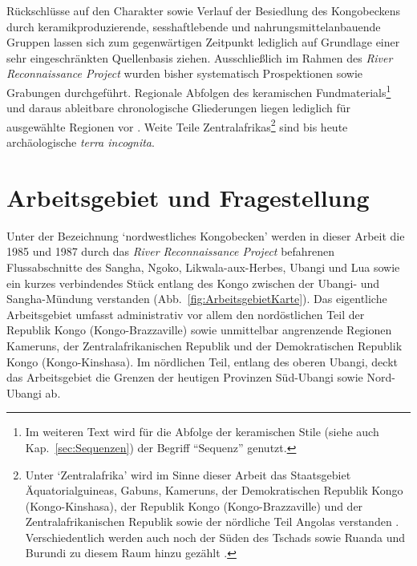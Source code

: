 \begin{multicols}{2}
Rückschlüsse auf den Charakter sowie Verlauf der Besiedlung des Kongobeckens durch keramikproduzierende, sesshaftlebende und nahrungsmittelanbauende Gruppen lassen sich zum gegenwärtigen Zeitpunkt lediglich auf Grundlage einer sehr eingeschränkten Quellenbasis ziehen. Ausschließlich im Rahmen des \textit{River Reconnaissance Project} wurden bisher systematisch Prospektionen sowie Grabungen durchgeführt. Regionale Abfolgen des keramischen Fundmaterials\footnote{Im weiteren Text wird für die Abfolge der keramischen Stile (siehe auch Kap.~\ref{sec:Sequenzen}) der Begriff \enquote{Sequenz} genutzt.} und daraus ableitbare chronologische Gliederungen liegen lediglich für ausgewählte Regionen vor \parencites{Wotzka.1995}{MbidaMindzie.19951996}{AssokoNdong.20002001}{Clist.20042005}{Lavachery.2010}. Weite Teile Zentralafrikas\footnote{Unter \enquote*{Zentralafrika} wird im Sinne dieser Arbeit das Staatsgebiet Äquatorialguineas, Gabuns, Kameruns, der Demokratischen Republik Kongo (Kongo-Kinshasa), der Republik Kongo (Kongo-Brazzaville) und der Zentralafrikanischen Republik sowie der nördliche Teil Angolas verstanden \parencite[183]{Eggert.2014}. Verschiedentlich werden auch noch der Süden des Tschads sowie Ruanda und Burundi zu diesem Raum hinzu gezählt \parencite[421]{Maret.2005}.} sind bis heute archäologische \textit{terra incognita}.

\section{Arbeitsgebiet und Fragestellung}\label{sec:Arbeitsgebiet}

Unter der Bezeichnung \enquote*{nordwestliches Kongobecken} werden in dieser Arbeit die 1985 und 1987 durch das \textit{River Reconnaissance Project} befahrenen Flussabschnitte des \mbox{Sangha}, \mbox{Ngoko}, Likwala-aux-Herbes, \mbox{Ubangi} und Lua sowie ein kurzes verbindendes Stück entlang des Kongo zwischen der \mbox{Ubangi}- und \mbox{Sangha}-Mündung verstanden (Abb.~\ref{fig:ArbeitsgebietKarte}). Das eigentliche Arbeitsgebiet umfasst administrativ vor allem den nordöstlichen Teil der Republik Kongo (Kongo-Brazzaville) sowie unmittelbar angrenzende Regionen Kameruns, der Zentralafrikanischen Republik und der Demokratischen Republik Kongo (Kongo-Kinshasa). Im nördlichen Teil, entlang des oberen \mbox{Ubangi}, deckt das Arbeitsgebiet die Grenzen der heutigen Provinzen Süd-\mbox{Ubangi} sowie Nord-\mbox{Ubangi} ab.


\end{multicols}
